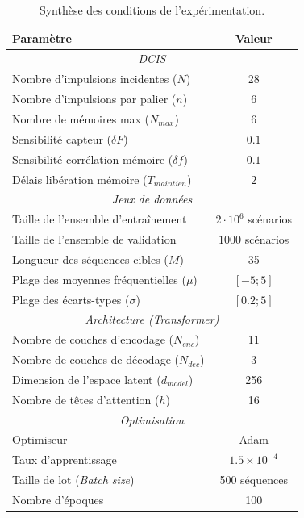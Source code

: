 \begin{table}[htbp]
\centering
\begin{tabular}{lc}
\toprule
\textbf{Paramètre} & \textbf{Valeur} \\
\midrule
\multicolumn{2}{c}{\textit{DCIS}} \\
\midrule
Nombre d'impulsions incidentes ($N$) & 28 \\
Nombre d'impulsions par palier ($n$) & $6$ \\
Nombre de mémoires max ($N_{max}$) & $6$ \\
Sensibilité capteur ($\delta F$) & $0.1$\\
Sensibilité corrélation mémoire ($\delta f$) & $0.1$\\
Délais libération mémoire ($T_{maintien}$) & $2$\\
\midrule
\multicolumn{2}{c}{\textit{Jeux de données}} \\
\midrule
Taille de l'ensemble d'entraînement & $2 \cdot 10^6$ scénarios \\
Taille de l'ensemble de validation & $1000$ scénarios \\
Longueur des séquences cibles ($M$) & 35 \\
Plage des moyennes fréquentielles ($\mu$) & $[-5 ; 5]$ \\
Plage des écarts-types ($\sigma$) & $[0.2 ; 5]$ \\
\midrule
\multicolumn{2}{c}{\textit{Architecture (Transformer)}} \\
\midrule
Nombre de couches d'encodage ($N_{enc}$) & 11 \\
Nombre de couches de décodage ($N_{dec}$) & 3 \\
Dimension de l'espace latent ($d_{model}$) & 256 \\
Nombre de têtes d'attention ($h$) & 16 \\
\midrule
\multicolumn{2}{c}{\textit{Optimisation}} \\
\midrule
Optimiseur & Adam \\
Taux d'apprentissage & $1.5 \times 10^{-4}$ \\
Taille de lot (\textit{Batch size}) & 500 séquences \\
Nombre d'époques & 100 \\
\bottomrule
\end{tabular}
\caption{Synthèse des conditions de l'expérimentation.}
\label{tab:params_bloc}
\end{table}

